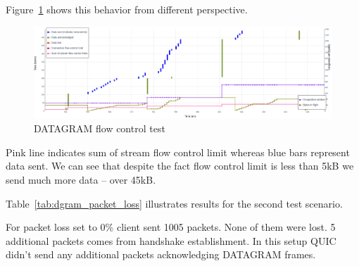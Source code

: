 Figure~\ref{fig:dgram_flow_control2} shows this behavior from different perspective.
\begin{figure}
    \centering
    \includegraphics[width=\textwidth]{img/__09__datagrams/dgram_flow_control_2.png}
    \caption{DATAGRAM flow control test}
    \label{fig:dgram_flow_control2}
\end{figure}
Pink line indicates sum of stream flow control limit whereas blue bars represent data sent.
We can see that despite the fact flow control limit is less than 5kB we send much more data -- over 45kB\@.



Table~\ref{tab:dgram_packet_loss} illustrates results for the second test scenario.

\begin{table}
    \centering
    \caption{\label{tab:dgram_packet_loss}Number of packets sent with and without packet loss for DATAGRAM frames.}
\end{table}

For packet loss set to 0\% client sent 1005 packets.
None of them were lost.
5 additional packets comes from handshake establishment.
In this setup QUIC didn't send any additional packets acknowledging DATAGRAM frames.

